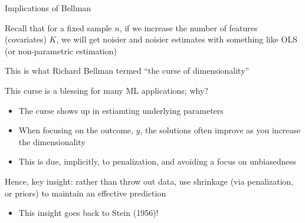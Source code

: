 \documentclass[notes,11pt, aspectratio=169]{beamer}
\newenvironment{wideitemize}{\itemize\addtolength{\itemsep}{10pt}}{\enditemize}
\begin{document}
\begin{frame}{Implications of Bellman}
  \begin{wideitemize}
  \item Recall that for a fixed sample $n$, if we increase the number
    of features (covariates) $K$, we will get noisier and noisier
    estimates with something like OLS (or non-parametric estimation)
  \item This is what Richard Bellman termed ``the curse of dimensionality''
  \item This curse is a blessing for many ML applications; why?
    \begin{itemize}
    \item The curse shows up in estiamting underlying parameters
    \item When focusing on the outcome, $y$, the solutions often
      improve as you increase the dimensionality
    \item This is due, implicitly, to penalization, and avoiding a
      focus on unbiasedness
    \end{itemize}
  \item Hence, key insight: rather than throw out data, use shrinkage
    (via penalization, or priors) to maintain an effective prediction
    \begin{itemize}
    \item This insight goes back to Stein (1956)!
    \end{itemize}
  \end{wideitemize}
\end{frame}
\end{document}
